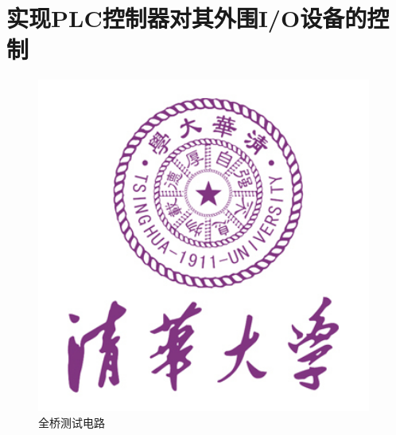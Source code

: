 \part{实现PLC控制器对其外围I/O设备的控制}

\begin{figure}[htbp]
\centering
\includegraphics[width=11cm]{resource/logo.jpg}
\caption{全桥测试电路}
\label{fig:fullarm}
\end{figure}


